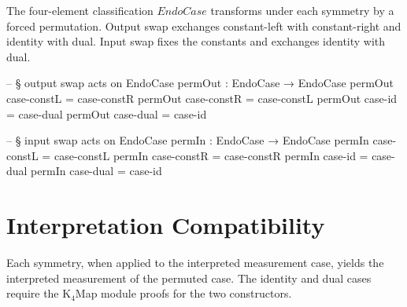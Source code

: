 \documentclass[11pt,a4paper]{book}
\def\texttt#1{#1}%
\begin{document}
The four-element classification $\texttt{EndoCase}$ transforms under each symmetry
by a forced permutation.  Output swap exchanges constant-left with constant-right
and identity with dual.  Input swap fixes the constants and exchanges identity with dual.

\begin{code}
-- § output swap acts on EndoCase
permOut : EndoCase → EndoCase
permOut case-constL = case-constR
permOut case-constR = case-constL
permOut case-id     = case-dual
permOut case-dual   = case-id

-- § input swap acts on EndoCase
permIn : EndoCase → EndoCase
permIn case-constL = case-constL
permIn case-constR = case-constR
permIn case-id     = case-dual
permIn case-dual   = case-id
\end{code}

\section{Interpretation Compatibility}

Each symmetry, when applied to the interpreted measurement case, yields the
interpreted measurement of the permuted case.  The identity and dual cases require
the K$_4$Map module proofs for the two constructors.
\end{document}

